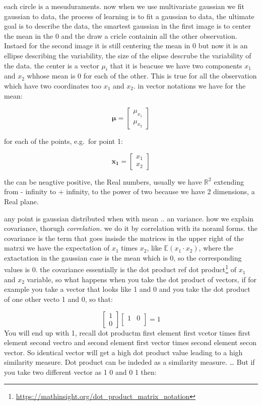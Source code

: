 \documentclass[
  12pt,
  a4paper,
  oneside]{book}
\DeclareRobustCommand{\href}[2]{#2\footnote{\url{#1}}}
\theoremstyle{definition}
\theoremstyle{definition}
\theoremstyle{definition}
\theoremstyle{remark}
\begin{document}
each circle is a mesuduraments. now when we use multivariate gaussian we fit gaussian to data, the process of learning is to fit a gaussian to data, the ultimate goal is to describe the data, the smartest gaussian in the first image is to center the mean in the 0 and the draw a cricle containin all the other observation. Instaed for the second image it is still centering the mean in 0 but now it is an ellipse describing the variability, the size of the elipse descrube the variability of the data.
the center is a vector \(\mu_{i}\) that it is beacuse we have two components \(x_1\) and \(x_2\) whhose mean is 0 for each of the other. This is true for all the observation which have two coordinates too \(x_1\) and \(x_2\). in vector notations we have for the mean:

\[
\boldsymbol{\mu}=\left[\begin{array}{ll}
\mu_{x_1} \\
\mu_{x_2}
\end{array}\right]
\]

for each of the points, e.g.~for point 1:

\[
\mathbf{x_1}=\left[\begin{array}{ll}
x_1 \\
x_2
\end{array}\right]
\]

the can be neagtive positive, the Real numbers, usually we have \(\mathbb{R}^{2}\) extending from - infinity to + infinity, to the power of two because we have 2 dimensions, a Real plane.

any point is gaussian distributed when with mean .. an variance.
how we explain covariance, thorugh \emph{correlation.}
we do it by correlation with its noraml forms. the covariance is the term that goes insisde the matrices in the upper right of the matrxi we have the expectation of \(x_1\) times \(x_2\), like \(\mathbb{E}(x_1 \cdot x_2)\), where the extactation in the gaussian case is the mean which is 0, so the corresponding values is 0.
the covariance essentially is the dot product \href{https://mathinsight.org/dot_product_matrix_notation}{ref dot product} of \(x_1\) and \(x_2\) variable, so what happens when you take the dot product of vectors,
if for example you take a vector that looks like 1 and 0 and you take the dot product of one other vecto 1 and 0, so that:

\[
\left[\begin{array}{ll}
1 \\
0
\end{array}\right]\left[\begin{array}{ll}
1 & 0 \\
\end{array}\right] = 1
\]
You will end up with 1, recall dot productm first element first vcetor times first element second vectro and second element first vector times second element secon vector. So identical vector will get a high dot product value leading to a high similarity measure. Dot product can be indeded as a similarity measure.
\ldots{} But if you take two different vector as 1 0 and 0 1 then:
\end{document}
